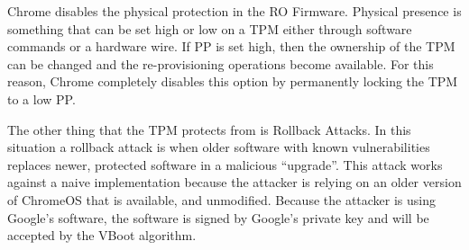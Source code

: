 \documentclass[../report.tex]{subfiles}
\begin{document}
Chrome disables the physical protection in the RO Firmware.
Physical presence is something that can be set high or low on a TPM either through software commands or a hardware wire. 
If PP is set high, then the ownership of the TPM can be changed and the re-provisioning operations become available.
For this reason, Chrome completely disables this option by permanently locking the TPM to a low PP\@.

The other thing that the TPM protects from is Rollback Attacks.
In this situation a rollback attack is when older software with known vulnerabilities replaces newer, protected software in a malicious ``upgrade''.
This attack works against a naive implementation because the attacker is relying on an older version of ChromeOS that is available, and unmodified.
Because the attacker is using Google's software, the software is signed by Google's private key and will be accepted by the VBoot algorithm.
\end{document}
